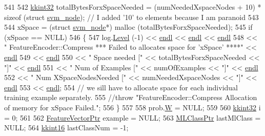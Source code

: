 \begin{DoxyCode}
541 
542   \hyperlink{namespace_k_k_b_a8fa4952cc84fda1de4bec1fbdd8d5b1b}{kkint32}  totalBytesForxSpaceNeeded = (numNeededXspaceNodes + 10) * \textcolor{keyword}{sizeof} (\textcolor{keyword}{struct} 
      \hyperlink{struct_s_v_m233_1_1svm__node}{svm\_node});  \textcolor{comment}{// I added '10' to elements because I am paranoid}
543 
544   xSpace = (\textcolor{keyword}{struct }\hyperlink{struct_s_v_m233_1_1svm__node}{svm\_node}*) malloc (totalBytesForxSpaceNeeded);
545   \textcolor{keywordflow}{if}  (xSpace == NULL)
546   \{
547     log.\hyperlink{class_k_k_b_1_1_run_log_a32cf761d7f2e747465fd80533fdbb659}{Level} (-1) << \hyperlink{namespace_k_k_b_ad1f50f65af6adc8fa9e6f62d007818a8}{endl} << \hyperlink{namespace_k_k_b_ad1f50f65af6adc8fa9e6f62d007818a8}{endl} << \hyperlink{namespace_k_k_b_ad1f50f65af6adc8fa9e6f62d007818a8}{endl}
548                    << \textcolor{stringliteral}{" FeatureEncoder::Compress   *** Failed to allocates space for 'xSpace' ****"} << 
      \hyperlink{namespace_k_k_b_ad1f50f65af6adc8fa9e6f62d007818a8}{endl}
549                    << \hyperlink{namespace_k_k_b_ad1f50f65af6adc8fa9e6f62d007818a8}{endl}
550                    << \textcolor{stringliteral}{"     Space needed          ["} << totalBytesForxSpaceNeeded << \textcolor{stringliteral}{"]"} << 
      \hyperlink{namespace_k_k_b_ad1f50f65af6adc8fa9e6f62d007818a8}{endl}
551                    << \textcolor{stringliteral}{"     Num of Examples       ["} << numOfExamples             << \textcolor{stringliteral}{"]"} << 
      \hyperlink{namespace_k_k_b_ad1f50f65af6adc8fa9e6f62d007818a8}{endl}
552                    << \textcolor{stringliteral}{"     Num XSpaceNodesNeeded ["} << numNeededXspaceNodes      << \textcolor{stringliteral}{"]"} << 
      \hyperlink{namespace_k_k_b_ad1f50f65af6adc8fa9e6f62d007818a8}{endl}
553                    << \hyperlink{namespace_k_k_b_ad1f50f65af6adc8fa9e6f62d007818a8}{endl};
554     \textcolor{comment}{// we sill have to allocate space for each individual training example separately.}
555     \textcolor{comment}{//throw "FeatureEncoder::Compress     Allocation of memory for xSpace Failed.";}
556   \}
557 
558   prob.\hyperlink{struct_s_v_m233_1_1svm__problem_a499ec12b246a796ab0951be8dab5cec5}{W} = NULL;
559 
560   \hyperlink{namespace_k_k_b_a8fa4952cc84fda1de4bec1fbdd8d5b1b}{kkint32} i = 0;
561  
562   \hyperlink{class_k_k_m_l_l_1_1_feature_vector}{FeatureVectorPtr}  example      = NULL;
563   \hyperlink{class_k_k_m_l_l_1_1_m_l_class}{MLClassPtr}        lastMlClass  = NULL;
564   \hyperlink{namespace_k_k_b_a93809780ee294124dda4c23069f41248}{kkint16}           lastClassNum = -1;

\end{DoxyCode}
